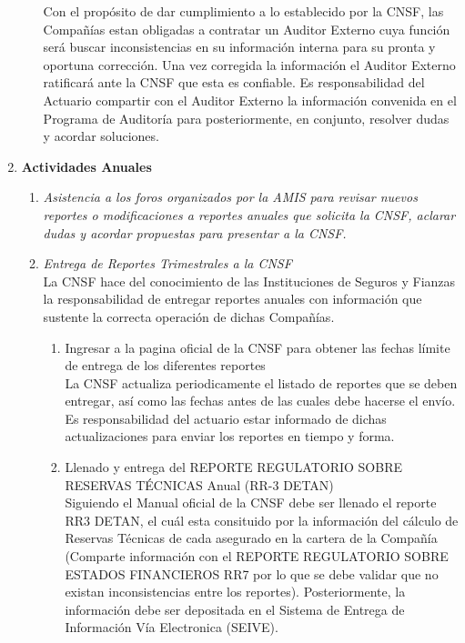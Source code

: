 \documentclass[11pt,twoside,openright,spanish]{report}
\numberwithin{equation}{chapter}
\numberwithin{figure}{chapter}
\numberwithin{table}{chapter}
\begin{document}
\begin{singlespace}
\begin{enumerate}
\begin{enumerate}
			Con el propósito de dar cumplimiento a lo establecido por la CNSF, las Compañías estan obligadas a contratar un Auditor Externo cuya función será buscar inconsistencias en su información interna para su pronta y oportuna corrección. Una vez corregida la información el Auditor Externo ratificará ante la CNSF que esta es confiable. Es responsabilidad del Actuario compartir con el Auditor Externo la información convenida en el Programa de Auditoría para posteriormente, en conjunto, resolver dudas y acordar soluciones. 
		\end{enumerate}
		\item \textbf{Actividades Anuales}
		\begin{enumerate}
			\item \textit{Asistencia a los foros organizados por la AMIS para revisar nuevos reportes o modificaciones a reportes anuales que solicita la CNSF, aclarar dudas y acordar propuestas para presentar a la CNSF.} \\ 
			\item \textit{Entrega de Reportes Trimestrales a la CNSF} \\ \-\hspace{0.5cm}
			La CNSF hace del conocimiento de las Instituciones de Seguros y Fianzas la responsabilidad de entregar reportes anuales con información que sustente la correcta operación de dichas Compañías.
			\begin{enumerate}
				\item {Ingresar a la pagina oficial de la CNSF para obtener las fechas límite de entrega de los diferentes reportes} \\ \-\hspace{0.5cm}
				La CNSF actualiza periodicamente el listado de reportes que se deben entregar, así como las fechas antes de las cuales debe hacerse el envío. Es responsabilidad del actuario estar informado de dichas actualizaciones para enviar los reportes en tiempo y forma.
				\item {Llenado y entrega del REPORTE REGULATORIO SOBRE RESERVAS TÉCNICAS Anual (RR-3 DETAN)} \\ \-\hspace{0.5cm}
				Siguiendo el Manual oficial de la CNSF debe ser llenado el reporte RR3 DETAN, el cuál esta consituido por la información del cálculo de Reservas Técnicas de cada asegurado en la cartera de la Compañía (Comparte información con el REPORTE REGULATORIO SOBRE ESTADOS FINANCIEROS RR7 por lo que se debe validar que no existan inconsistencias entre los reportes). Posteriormente, la información debe ser depositada en el Sistema de Entrega de Información Vía Electronica (SEIVE).

\end{enumerate}
\end{enumerate}
\end{enumerate}
\end{singlespace}
\end{document}
